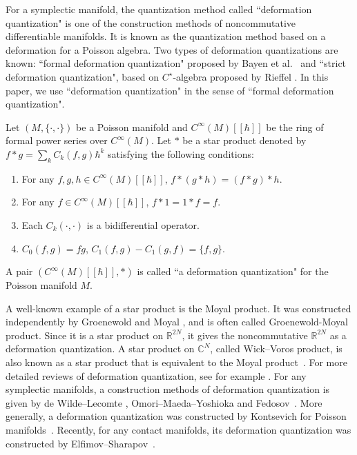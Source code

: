 \documentclass[10pt,a4paper]{amsart}
\numberwithin{equation}{section}
\begin{document}
For a symplectic manifold, the quantization method called ``deformation quantization" is one of the construction methods of noncommutative differentiable manifolds. It is known as the quantization method based on a deformation for a Poisson algebra. Two types of deformation quantizations are known: ``formal deformation quantization" proposed by Bayen et al.~\cite{BFFLS} and ``strict deformation quantization", based on $C^{\star}$-algebra proposed by Rieffel \cite{Rief1,Rief2,Rief3}. In this paper, we use ``deformation quantization" in the sense of ``formal deformation quantization".
\begin{Definition}\label{dq_def}
 Let
 $
 (
 M,
 \{
 \cdot,
 \cdot
 \}
 )
 $
 be a Poisson manifold and
 $
 C^{\infty}
 (M)
 [\!
 [
 \hbar
 ]
 \!]
 $
 be the ring of formal power series over
 $
 C^{\infty}(M).
 $ Let $\ast$ be a star product denoted by
 $
 f
 \ast
 g
 =
 \sum_{k}
 C_{k} (f,g )
 \hbar^{k}
 $
 satisfying the following conditions:
 \begin{enumerate}\itemsep=0pt
 \item[(1)]
 For any
 $ f,g,h \in C^{\infty} (M)[\![ \hbar] \!]$, $ f \ast( g \ast h) = ( f \ast g) \ast h$.
 \item[(2)]
 For any
 $
 f
 \in
 C^{\infty}
 (M)
 [\!
 [
 \hbar
 ]
 \!]
 $,
 $
 f
 \ast
 1
 =
 1
 \ast
 f
 =
 f.
 $
 \item[(3)]
 Each $C_{k}(\cdot,\cdot)$ is a bidifferential operator.

 \item[(4)]
 $
 C_{0}
 (
 f,
 g
 )
 =
 fg$,
 $
 C_{1}
 (
 f,
 g
 )
 -
 C_{1}
 (
 g,
 f
 )
 =
 \{f,g\} $.
 \end{enumerate}
 A pair
 $
 (
 C^{\infty}
 (M)
 [\!
 [
 \hbar
 ]
 \!],
 \ast
 )
 $
 is called ``a deformation quantization" for the Poisson manifold $M$.
\end{Definition}

A well-known example of a star product is the Moyal product. It was constructed independently by Groenewold \cite{Groe} and Moyal \cite{Moya}, and is often called Groenewold-Moyal product. Since it is a star product on $\mathbb{R}^{2N}$, it gives the noncommutative $\mathbb{R}^{2N}$ as a deformation quantization. A star product on $\mathbb{C}^{N}$, called Wick--Voros product, is also known as a star product that is equivalent to the Moyal product~\cite{Voro}. For more detailed reviews of deformation quantization, see for example \cite{GUT,Mosha}. For any symplectic manifolds, a construction methods of deformation quantization is given by de Wilde--Lecomte \cite{DL}, Omori--Maeda--Yoshioka \cite{OMY1} and Fedosov~\cite{Fedo}. More generally, a deformation quantization was constructed by Kontsevich for Poisson manifolds~\cite{Kont1}. Recently, for any contact manifolds, its deformation quantization was constructed by Elfimov--Sharapov~\cite{ES}.
\end{document}
